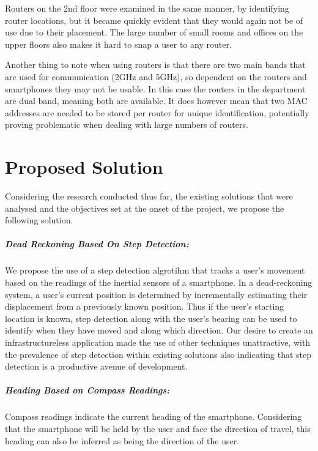 \documentclass[12pt,a4paper]{report}
\begin{document}
Routers on the 2nd floor were examined in the same manner, by identifying router locations, but it became quickly evident that they would again not be of use due to their placement. The large number of small rooms and offices on the upper floors also makes it hard to snap a user to any router.

Another thing to note when using routers is that there are two main bands that are used for communication (2GHz and 5GHz), so dependent on the routers and smartphones they may not be usable. In this case the routers in the department are dual band, meaning both are available. It does however mean that two MAC addresses are needed to be stored per router for unique identification, potentially proving problematic when dealing with large numbers of routers.

\chapter{Proposed Solution}

Considering the research conducted thus far, the existing solutions that were analysed and the objectives set at the onset of the project, we propose the following solution.

\paragraph{Dead Reckoning Based On Step Detection:}

We propose the use of a step detection algrotihm that tracks a user's movement based on the readings of the inertial sensors of a smartphone. In a dead-reckoning system, a user's current position is determined by incrementally estimating their displacement from a previously known position. Thus if the user's starting location is known, step detection along with the user's bearing can be used to identify when they have moved and along which direction. Our desire to create an infrastructureless application made the use of other techniques unattractive, with the prevalence of step detection within existing solutions also indicating that step detection is a productive avenue of development.

\paragraph{Heading Based on Compass Readings:}

Compass readings indicate the current heading of the smartphone. Considering that the smartphone will be held by the user and face the direction of travel, this heading can also be inferred as being the direction of the user.
\end{document}
